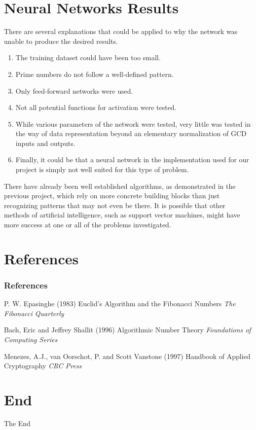 \documentclass{beamer}
\begin{document}
\section{Neural Networks Results}

\begin{frame}
There are several explanations that could be applied to why the network was unable to produce the desired results.
\begin{enumerate}
\item The training dataset could have been too small.
\item Prime numbers do not follow a well-defined pattern.
\item Only feed-forward networks were used.
\item Not all potential functions for activation were tested.
\item While various parameters of the network were tested, very little was tested in the way of data representation beyond an elementary normalization of GCD inputs and outputs.
\item Finally, it could be that a neural network in the implementation used for our project is simply not well suited for this type of problem.
\end{enumerate}
\end{frame}

\begin{frame}
There have already been well established algorithms, as demonstrated in the previous project, which rely on more concrete building blocks than just recognizing patterns that may not even be there. It is possible that other methods of artificial intelligence, such as support vector machines, might have more success at one or all of the problems investigated.
\end{frame}




\section{References}
\begin{frame}
\frametitle{References}
\footnotesize{
\begin{thebibliography}{99} %
 P. W. Epasinghe (1983)
\newblock Euclid's Algorithm and the Fibonacci Numbers
\newblock \emph{The Fibonacci Quarterly}

 Bach, Eric and Jeffrey Shallit (1996)
\newblock Algorithmic Number Theory
\newblock \emph{Foundations of Computing Series}

 Menezes, A.J., van Oorschot, P. and Scott Vanstone (1997)
\newblock Handbook of Applied Cryptography
\newblock \emph{CRC Press}
\end{thebibliography}
}
\end{frame}

\section{End}
\begin{frame}
\Huge{\centerline{The End}}
\end{frame}

\end{document}
